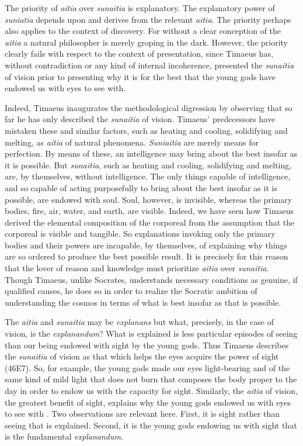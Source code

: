 The priority of \emph{aitia} over \emph{sunaitia} is explanatory. The explanatory power of \emph{suniatia} depends upon and derives from the relevant \emph{aitia}. The priority perhaps also applies to the context of discovery. For without a clear conception of the \emph{aitia} a natural philosopher is merely groping in the dark. However, the priority clearly fails with respect to the context of presentation, since Timaeus has, without contradiction or any kind of internal incoherence, presented the \emph{sunaitia} of vision prior to presenting why it is for the best that the young gods have endowed us with eyes to see with.

Indeed, Timaeus inaugurates the methodological digression by observing that so far he has only described the \emph{sunaitia} of vision. Timaeus' predecessors have mistaken these and similar factors, such as heating and cooling, solidifying and melting, as \emph{aitia} of natural phenomena. \emph{Suniaitia} are merely means for perfection. By means of these, an intelligence may bring about the best insofar as it is possible. But \emph{sunaitia}, such as heating and cooling, solidifying and melting, are, by themselves, without intelligence. The only things capable of intelligence, and so capable of acting purposefully to bring about the best insofar as it is possible, are endowed with soul. Soul, however, is invisible, whereas the primary bodies, fire, air, water, and earth, are visible. Indeed, we have seen how Timaeus derived the elemental composition of the corporeal from the assumption that the corporeal is visible and tangible. So explanations invoking only the primary bodies and their powers are incapable, by themselves, of explaining why things are so ordered to produce the best possible result. It is precisely for this reason that the lover of reason and knowledge must prioritize \emph{aitia} over \emph{sunaitia}. Though Timaeus, unlike Socrates, understands necessary conditions as genuine, if qualified causes, he does so in order to realize the Socratic ambition of understanding the cosmos in terms of what is best insofar as that is possible. 

The \emph{aitia} and \emph{sunaitia} may be \emph{explanans} but what, precisely, in the case of vision, is the \emph{explanandum}? What is explained is less particular episodes of seeing than our being endowed with sight by the young gods. Thus Timaeus describes the \emph{sunaitia} of vision as that which helps the eyes acquire the power of sight (46E7). So, for example, the young gods made our eyes light-bearing and of the same kind of mild light that does not burn that composes the body proper to the day in order to endow us with the capacity for sight. Similarly, the \emph{aitia} of vision, the greatest benefit of sight, explains why the young gods endowed us with eyes to see with \citep[107--9]{Johansen:2004dx}. Two observations are relevant here. First, it is sight rather than seeing that is explained. Second, it is the young gods endowing us with sight that is the fundamental \emph{explanandum}.

